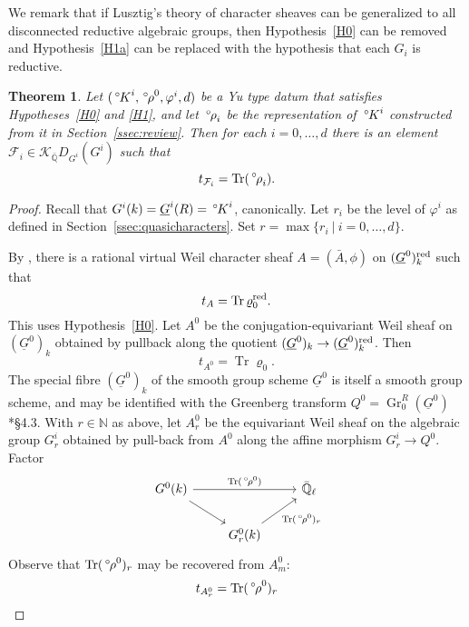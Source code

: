\documentclass[10pt]{amsart}
\theoremstyle{plain}
\newtheorem{theorem}{Theorem}[section]
\theoremstyle{definition}
\newcommand{\NN}{{\mathbb{N}}}
\newcommand{\QQ}{{\mathbb{Q}}}
\newcommand{\EE}{\mathbb{\bar Q}_\ell}
\newcommand{\bFq}{\bar{k}}
\newcommand{\Fq}{k}
\DeclareMathOperator{\Gr}{Gr}
\DeclareMathOperator{\trace}{Tr}
\newcommand{\tq}{{\ \vert\ }}
\newcommand{\trFrob}[1]{t_{#1}}
\newcommand{\cs}[1]{{\mathcal{#1}}}
\newcommand{\oK}{{\,^\circ \hskip-1pt K}}
\newcommand{\orho}{{\,^\circ \hskip-1pt \rho}}
\begin{document}
We remark that if Lusztig's theory of character sheaves can be generalized to all disconnected reductive algebraic groups, then Hypothesis~\ref{H0} can be removed and Hypothesis~\ref{H1a} can be replaced with the hypothesis that each $G_i$ is reductive.

\begin{theorem}\label{thm:geotypes}
Let $(\oK^i, \orho^0, \varphi^i,d)$ be a Yu type datum that satisfies Hypotheses~\ref{H0} and \ref{H1}, and let $\orho_i$ be the representation of $\oK^i$ constructed from it in Section~\ref{ssec:review}.  Then for each $i=0,\dots, d$ there is an element $\cs{F}_i \in \mathcal{K}_{\bar\QQ} D_{G^i}(G^i)$ such that
\[
\trFrob{\cs{F}_i} = \trace(\orho_i).
\]
\end{theorem}

\begin{proof}
Recall that $G^i(\Fq) = \underline{G}^i(R) = \oK^i$, canonically.
Let $r_i$ be the level of $\varphi^i$ as defined in Section~\ref{ssec:quasicharacters}.
Set $r = \max\{ r_i \tq i=0, \ldots ,d\}$.

By \cite{lusztig:disconnected1}, there is a rational virtual Weil character sheaf $A = ({\bar A},\phi)$ on $(\underline{G}^0)_\Fq^\reductive$ such that 
\[
\trFrob{A} = \trace \varrho_0^\reductive.
\]
This uses Hypothesis~\ref{H0}.
%
Let $A^0$ be the conjugation-equivariant Weil sheaf on $(\underline{G}^0)_\Fq$ obtained by pullback along the quotient $(\underline{G}^0)_\Fq \to (\underline{G}^0)_\Fq^\reductive$.
Then 
\[
\trFrob{A^0} = \trace \varrho_0.
\]
The special fibre $(\underline{G}^0)_\Fq$ of the smooth group scheme $\underline{G}^0$ is itself a smooth group scheme, and may be identified with the Greenberg transform $Q^0 = \Gr^{R}_0(\underline{G}^0)$ \cite{cunningham-roe:13a}*{\S 4.3}. 
With $r\in \NN$ as above, let ${A}_r^0$ be the equivariant Weil sheaf on the algebraic group $G_r^i$ obtained by pull-back from $A^0$ along the affine morphism $G_r^i \to Q^0$.
Factor
\begin{equation}\label{eqn:tracerho}
\begin{tikzcd}
G^0(\Fq) \arrow{rr}{\trace(\orho^0)} \arrow{rd} && \EE \\
& G_r^0(\Fq) \arrow{ru}[swap]{\trace(\orho^0)_r} 
\end{tikzcd}
\end{equation}
Observe that $\trace(\orho^0)_r$ may be recovered from ${A}_m^0$:
\[
\trFrob{{A}^0_r} = \trace(\orho^0)_r
\]


\end{proof}
\end{document}
